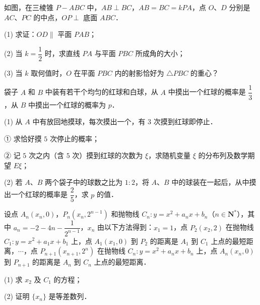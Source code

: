 \begin{question}
如图，在三棱锥 $P - ABC$ 中，$AB \perp BC$，$AB = BC = kPA$，点 $O$、$D$ 分别是 $AC$、$PC$ 的中点，$OP \perp$ 底面 $ABC$．

(1) 求证：$OD \parallel$ 平面 $PAB$；

(2) 当 $k = \dfrac{1}{2}$ 时，求直线 $PA$ 与平面 $PBC$ 所成角的大小；

(3) 当 $k$ 取何值时，$O$ 在平面 $PBC$ 内的射影恰好为 $\triangle PBC$ 的重心？
\nopagebreak[4]
\begin{center}\end{center}
\nopagebreak[4]
\end{question}
\begin{question}
袋子 $A$ 和 $B$ 中装有若干个均匀的红球和白球，从 $A$ 中摸出一个红球的概率是 $\dfrac{1}{3}$，从 $B$ 中摸出一个红球的概率为 $p$．

(1) 从 $A$ 中有放回地摸球，每次摸出一个，有 $3$ 次摸到红球即停止．

① 求恰好摸 $5$ 次停止的概率；

② 记 $5$ 次之内（含 $5$ 次）摸到红球的次数为 $\xi$，求随机变量 $\xi$ 的分布列及数学期望 $E\xi$；

(2) 若 $A$、$B$ 两个袋子中的球数之比为 $1:2$，将 $A$、$B$ 中的球装在一起后，从中摸出一个红球的概率是 $\dfrac{2}{5}$，求 $p$ 的值．

\end{question}
\begin{question}
设点 $A_n(x_n, 0)$，$P_n(x_n, 2^{n-1})$ 和抛物线 $C_n: y = x^2 + a_nx + b_n$（$n \in \mathbf{N}^*$），其中 $a_n = -2 - 4n - \dfrac{1}{2^{n-1}}$，$x_n$ 由以下方法得到：$x_1 = 1$，点 $P_2(x_2, 2)$ 在抛物线 $C_1: y = x^2 + a_1x + b_1$ 上，点 $A_1(x_1, 0)$ 到 $P_2$ 的距离是 $A_1$ 到 $C_1$ 上点的最短距离，$\cdots$，点 $P_{n+1}(x_{n+1}, 2^n)$ 在抛物线 $C_n: y = x^2 + a_nx + b_n$ 上，点 $A_n(x_n, 0)$ 到 $P_{n+1}$ 的距离是 $A_n$ 到 $C_n$ 上点的最短距离．

(1) 求 $x_2$ 及 $C_1$ 的方程；

(2) 证明 $\{x_n\}$ 是等差数列．

\end{question}